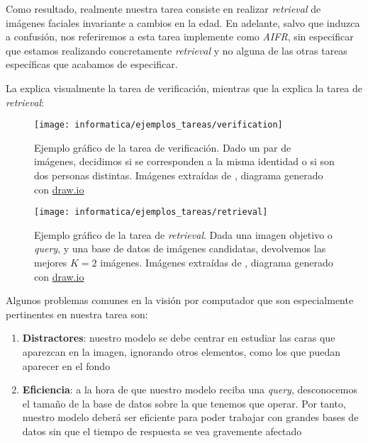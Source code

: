 Como resultado, realmente nuestra tarea consiste en realizar \textit{retrieval} de imágenes faciales invariante a cambios en la edad. En adelante, salvo que induzca a confusión, nos referiremos a esta tarea implemente como \textit{AIFR}, sin especificar que estamos realizando concretamente \textit{retrieval} y no alguna de las otras tareas específicas que acabamos de especificar.

La  explica visualmente la tarea de verificación, mientras que la  explica la tarea de \textit{retrieval}:

\begin{figure}[H]
    \centering
    \texttt{[image: informatica/ejemplos\_tareas/verification]}
    \caption{Ejemplo gráfico de la tarea de verificación. Dado un par de imágenes, decidimos si se corresponden a la misma identidad o si son dos personas distintas. Imágenes extraídas de \cite{informatica:cacd_dataset}, diagrama generado con \url{draw.io}}
    \label{img:ejemplo_verificacion}
\end{figure}

\begin{figure}[H]
    \centering
    \texttt{[image: informatica/ejemplos\_tareas/retrieval]}
    \caption{Ejemplo gráfico de la tarea de \textit{retrieval}. Dada una imagen objetivo o \textit{query}, y una base de datos de imágenes candidatas, devolvemos las mejores $K = 2$ imágenes. Imágenes extraídas de \cite{informatica:cacd_dataset}, diagrama generado con \url{draw.io}}
    \label{img:ejemplo_retrieval}
\end{figure}

Algunos problemas comunes en la visión por computador que son especialmente pertinentes en nuestra tarea son:

\begin{enumerate}
    \item \textbf{Distractores}: nuestro modelo se debe centrar en estudiar las caras que aparezcan en la imagen, ignorando otros elementos, como los que puedan aparecer en el fondo
    \item \textbf{Eficiencia}: a la hora de que nuestro modelo reciba una \textit{query}, desconocemos el tamaño de la base de datos sobre la que tenemos que operar. Por tanto, nuestro modelo deberá ser eficiente para poder trabajar con grandes bases de datos sin que el tiempo de respuesta se vea gravemente afectado
\end{enumerate}

